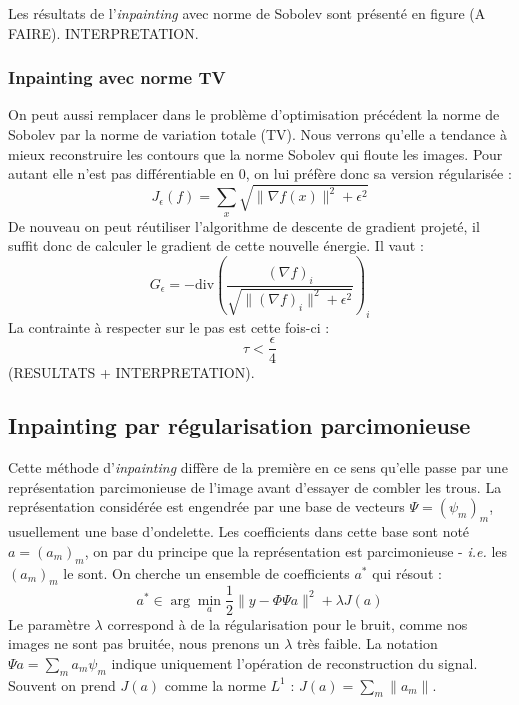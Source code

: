 Les résultats de l'\emph{inpainting} avec norme de Sobolev sont présenté en figure (A FAIRE). INTERPRETATION.

 
\subsubsection{Inpainting avec norme TV}

On peut aussi remplacer dans le problème d'optimisation précédent la norme de Sobolev par la norme de variation totale (TV). Nous verrons qu'elle a tendance à mieux reconstruire les contours que la norme Sobolev qui floute les images. Pour autant elle n'est pas différentiable en 0, on lui préfère donc sa version régularisée :
\begin{equation}
J_{\epsilon}(f) = \sum_x \sqrt{\|\nabla f(x) \|^2 + \epsilon^2}
\end{equation}
De nouveau on peut réutiliser l'algorithme de descente de gradient projeté, il suffit donc de calculer le gradient de cette nouvelle énergie. Il vaut : 
\begin{equation}
G_{\epsilon} = - \text{div} \left( \frac{(\nabla f)_i}{\sqrt{\| (\nabla f)_i \|^2 + \epsilon^2}}\right)_i
\end{equation}
La contrainte à respecter sur le pas est cette fois-ci :
\begin{equation}
\tau < \frac{\epsilon}{4}
\end{equation}
(RESULTATS + INTERPRETATION).


\subsection{Inpainting par régularisation parcimonieuse}

Cette méthode d'\emph{inpainting} diffère de la première en ce sens qu'elle passe par une représentation parcimonieuse de l'image avant d'essayer de combler les trous. La représentation considérée est engendrée par une base de vecteurs $\Psi = (\psi_m)_m$, usuellement une base d'ondelette. Les coefficients dans cette base sont noté $a =(a_m)_m$, on par du principe que la représentation est parcimonieuse - \emph{i.e.} les $(a_m)_m$ le sont. On cherche un ensemble de coefficients $a^*$ qui résout :
\begin{equation}
a^* \in \arg \min_a \frac{1}{2} \| y - \Phi \Psi a \|^2 + \lambda J(a)
\end{equation}
Le paramètre $\lambda$ correspond à de la régularisation pour le bruit, comme nos images ne sont pas bruitée, nous prenons un $\lambda$ très faible. La notation $\Psi a = \sum_m a_m \psi_m$ indique uniquement l'opération de reconstruction du signal. Souvent on prend $J(a)$ comme la norme $L^1$ : $J(a) = \sum_m \|a_m \|$.


